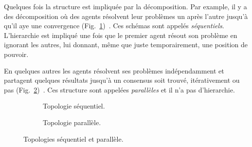 \documentclass[../main.tex]{subfiles}
\begin{document}
Quelques fois la structure est impliquée par la décomposition.
Par example, il y a des décomposition où des agents résolvent leur problèmes un après l'autre jusqu'à qu'il aye une convergence
(Fig.~\ref{fig:sequential_topology_fr})~\cite{LiuEtAl2009a}.
Ces schémas sont appelés \emph{séquentiels}.
L'hierarchie est impliqué une fois que le premier agent résout son problème en ignorant les autres, lui donnant, même que juste temporairement, une position de pouvoir.

En quelques autres les agents résolvent ses problèmes indépendamment et partagent quelques résultats jusqu'à un consensus soit trouvé, itérativement ou pas (Fig.~\ref{fig:parallel_topology_fr})~\cite{LiuEtAl2010}.
Ces structure sont appelées \emph{parallèles} et il n'a pas d'hierarchie.
\begin{figure}[h]
\begin{subfigure}[b]{.45\textwidth}
  \centering
  \caption{Topologie séquentiel.}\label{fig:sequential_topology_fr}
\end{subfigure}
\hfill
\begin{subfigure}[b]{.45\textwidth}
  \centering
  \caption{Topologie parallèle.}\label{fig:parallel_topology_fr}
\end{subfigure}
\caption{Topologies séquentiel et parallèle.}\label{fig:sequential_parallel_topology_fr}
\end{figure}
\end{document}
